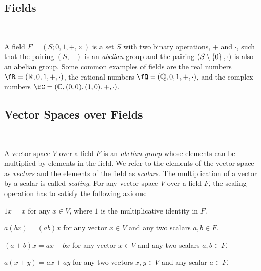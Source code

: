 \subsection{Fields}~\label{sec:def-fields}

A field $F = (S; 0, 1, +, \times)$ is a set $S$ with two binary operations, $+$ and $\cdot$,
such that the pairing $(S, +)$ is an \emph{abelian} group
and the pairing $(S \setminus \left\{ 0 \right\}, \cdot)$ is also an abelian group.
Some common examples of fields are the real numbers $\fR = (\R, 0, 1, +, \cdot)$,
the rational numbers $\fQ = (\Q, 0, 1, +, \cdot)$,
and the complex numbers $\fC = (\C, (0, 0), (1, 0), +, \cdot)$.


\subsection{Vector Spaces over Fields}~\label{sec:def-vector-spaces}

A vector space $V$ over a field $F$ is an \emph{abelian group}
whose elements can be multiplied by elements in the field.
We refer to the elements of the vector space as \emph{vectors}
and the elements of the field as \emph{scalars}.
The multiplication of a vector by a scalar is called \emph{scaling}.
For any vector space $V$ over a field $F$, the scaling operation
has to satisfy the following axioms:
\begin{enumroman}
  \item $1 x = x$ for any $x \in V$, where $1$ is the multiplicative identity in $F$.
  \item $a(bx) = (ab)x$ for any vector $x \in V$ and any two scalars $a, b \in F$.
  \item $(a+b)x = ax + bx$ for any vector $x \in V$ and any two scalars $a, b \in F$.
  \item $a(x+y) = ax + ay$ for any two vectors $x, y \in V$ and any scalar $a \in F$.
\end{enumroman}

